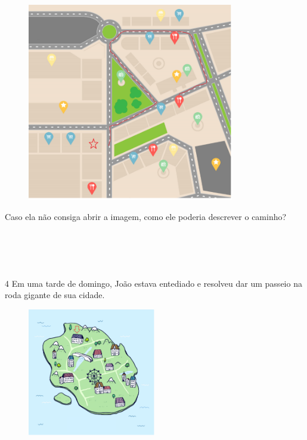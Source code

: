 {{\begin{figure}[H]
\centering\includegraphics[width=3.55in,height=3.406in]{./imgSAEB_8_MAT/media/image37.png}
\end{figure}


Caso ela não consiga abrir a imagem, como ele poderia descrever o
caminho?

\\
\\
\\
\\

\num{4} Em uma tarde de domingo, João estava entediado e resolveu dar um
passeio na roda gigante de sua cidade.

\begin{figure}[H]
\centering\includegraphics[width=2.2in,height=2.2in]{./imgSAEB_8_MAT/media/image38.png}
\end{figure}

}}
